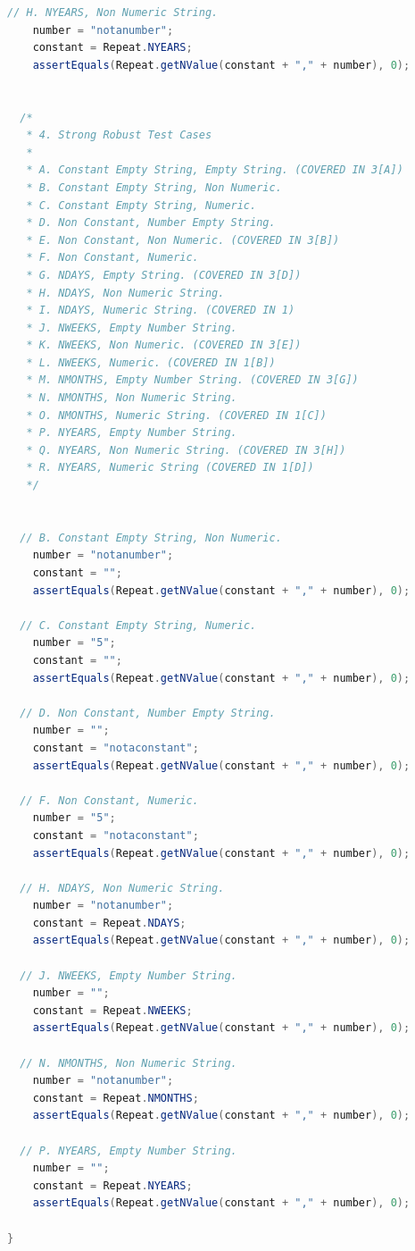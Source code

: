 \begin{lstlisting}[language=Java]
   // H. NYEARS, Non Numeric String.
    number = "notanumber";
    constant = Repeat.NYEARS;
    assertEquals(Repeat.getNValue(constant + "," + number), 0);


  /*
   * 4. Strong Robust Test Cases
   *
   * A. Constant Empty String, Empty String. (COVERED IN 3[A])
   * B. Constant Empty String, Non Numeric.
   * C. Constant Empty String, Numeric.
   * D. Non Constant, Number Empty String.
   * E. Non Constant, Non Numeric. (COVERED IN 3[B])
   * F. Non Constant, Numeric.
   * G. NDAYS, Empty String. (COVERED IN 3[D])
   * H. NDAYS, Non Numeric String.
   * I. NDAYS, Numeric String. (COVERED IN 1)
   * J. NWEEKS, Empty Number String.
   * K. NWEEKS, Non Numeric. (COVERED IN 3[E])
   * L. NWEEKS, Numeric. (COVERED IN 1[B])
   * M. NMONTHS, Empty Number String. (COVERED IN 3[G])
   * N. NMONTHS, Non Numeric String.
   * O. NMONTHS, Numeric String. (COVERED IN 1[C])
   * P. NYEARS, Empty Number String.
   * Q. NYEARS, Non Numeric String. (COVERED IN 3[H])
   * R. NYEARS, Numeric String (COVERED IN 1[D])
   */


  // B. Constant Empty String, Non Numeric.
    number = "notanumber";
    constant = "";
    assertEquals(Repeat.getNValue(constant + "," + number), 0);

  // C. Constant Empty String, Numeric.
    number = "5";
    constant = "";
    assertEquals(Repeat.getNValue(constant + "," + number), 0);

  // D. Non Constant, Number Empty String.
    number = "";
    constant = "notaconstant";
    assertEquals(Repeat.getNValue(constant + "," + number), 0);

  // F. Non Constant, Numeric.
    number = "5";
    constant = "notaconstant";
    assertEquals(Repeat.getNValue(constant + "," + number), 0);

  // H. NDAYS, Non Numeric String.
    number = "notanumber";
    constant = Repeat.NDAYS;
    assertEquals(Repeat.getNValue(constant + "," + number), 0);

  // J. NWEEKS, Empty Number String.
    number = "";
    constant = Repeat.NWEEKS;
    assertEquals(Repeat.getNValue(constant + "," + number), 0);

  // N. NMONTHS, Non Numeric String.
    number = "notanumber";
    constant = Repeat.NMONTHS;
    assertEquals(Repeat.getNValue(constant + "," + number), 0);

  // P. NYEARS, Empty Number String.
    number = "";
    constant = Repeat.NYEARS;
    assertEquals(Repeat.getNValue(constant + "," + number), 0);

}
\end{lstlisting}

